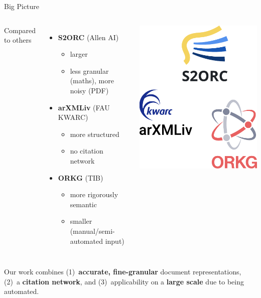 \documentclass[en,16:9,smallfoot]{sdqbeamer}
\begin{document}

   \begin{frame}[t]{Big Picture}
   \begin{columns}
        Compared to others

        \begin{itemize}
            \item \textbf{S2ORC} (Allen AI)
            \begin{itemize}
                \item larger
                \item less granular {\color{contextgrey}(maths)}, more noisy {\color{contextgrey}(PDF)}
            \end{itemize}
            \item \textbf{arXMLiv} (FAU KWARC)
            \begin{itemize}
                \item more structured
                \item no citation network
            \end{itemize}
            \item \textbf{ORKG} (TIB)
            \begin{itemize}
                \item more rigorously semantic
                \item smaller {\color{contextgrey}(manual/semi-automated input)}
            \end{itemize}
        \end{itemize}

            \includegraphics[width=0.5\linewidth]{imgs/relwork_v2}
   \end{columns}
   \vspace{1.5em}
   Our work combines (1)~\textbf{accurate, fine-granular} document representations,\\(2)~a \textbf{citation network}, and (3)~applicability on a \textbf{large scale} due to being automated.
   \end{frame}
\end{document}
